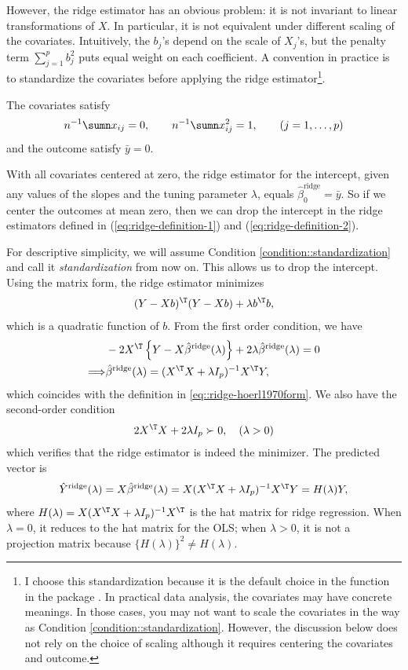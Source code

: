 However, the ridge estimator has an obvious problem: it is not invariant
to linear transformations of $X$. In particular, it is not equivalent
under different scaling of the covariates. Intuitively, the $b_{j}$'s
depend on the scale of $X_{j}$'s, but the penalty term $\sum_{j=1}^{p}b_{j}^{2}$
puts equal weight on each coefficient. A convention in practice is
to standardize the covariates before applying the ridge estimator\footnote{
I choose this standardization because it is the default choice in the function  in the  package . 
In practical data analysis, the covariates may have concrete meanings. In those cases, you may not want to scale the covariates in the way as Condition \ref{condition::standardization}. 
However, the discussion below does not rely on the choice of scaling although it requires centering the covariates and outcome. 
}.

\begin{condition}
[standardization]\label{condition::standardization}
The covariates satisfy
\[
n^{-1}\sumn x_{ij}=0,\qquad n^{-1}\sumn x_{ij}^{2}=1,\qquad(j=1,\ldots,p)
\]
and the outcome satisfy $\bar{y} = 0$.
\end{condition}


With all covariates centered at zero, the ridge estimator for
the intercept, given any values of the slopes and the tuning parameter $\lambda$,
equals 
$
\hat{\beta}_{0}^{\text{ridge}}=\bar{y}.
$
So if we center the outcomes at mean zero, then we can drop the intercept
in the ridge estimators defined in (\ref{eq:ridge-definition-1})
and (\ref{eq:ridge-definition-2}). 


For descriptive simplicity, we will assume Condition \ref{condition::standardization} and call it {\it standardization} from now on. This allows us to drop the intercept. Using the matrix form, the ridge estimator minimizes
\[
 (Y-Xb)^{\T}(Y-Xb)+\lambda b^{\T}b,
\]
which is a quadratic function of $b$. From the first order condition, we have
\begin{align*}
&-2X^{\T}\left\{ Y-X\hat{\beta}^{\text{ridge}}(\lambda)\right\} +2\lambda\hat{\beta}^{\text{ridge}}(\lambda)=0\\
\Longrightarrow & \hat{\beta}^{\text{ridge}}(\lambda)=(X^{\T}X+\lambda I_{p})^{-1}X^{\T}Y,
\end{align*}
which coincides with the definition in \eqref{eq::ridge-hoerl1970form}. We also have the second-order condition
\[
2X^{\T}X+2\lambda I_{p}\succ0,\quad(\lambda>0)
\]
which verifies that the ridge estimator is indeed the minimizer. 
The predicted vector is
$$
\hat{Y}^{\text{ridge}}(\lambda) = X \hat{\beta}^{\text{ridge}}(\lambda)= X (X^{\T}X+\lambda I_{p})^{-1}X^{\T}Y  = H(\lambda) Y,
$$
where $H(\lambda)  =  X (X^{\T}X+\lambda I_{p})^{-1}X^{\T} $ is the hat matrix for ridge regression. When $\lambda = 0$, it reduces to the hat matrix for the OLS; when $\lambda >0$, it is not a projection matrix because $\{  H(\lambda) \} ^2 \neq H(\lambda).$



